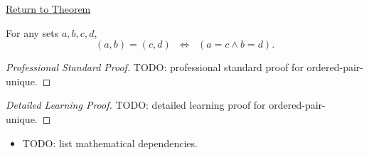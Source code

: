\newpage
{}
\label{prf:ordered-pair-unique}

\begin{remark*}[Return]
\hyperref[thm:ordered-pair-unique]{Return to Theorem}
\end{remark*}

\begin{theorem*}
For any sets $a,b,c,d$,
\[
(a,b) = (c,d)
\;\;\Longleftrightarrow\;\;
(a = c \land b = d).
\]
\end{theorem*}

\begin{proof}[Professional Standard Proof]
\LRAProofBodyStart
TODO: professional standard proof for ordered-pair-unique.
\end{proof}

\begin{proof}[Detailed Learning Proof]
\LRAProofBodyStart
TODO: detailed learning proof for ordered-pair-unique.
\end{proof}

\begin{remark*}
\end{remark*}

\begin{dependencies}
\begin{itemize}
  \item TODO: list mathematical dependencies.
\end{itemize}
\end{dependencies}

\clearpage
